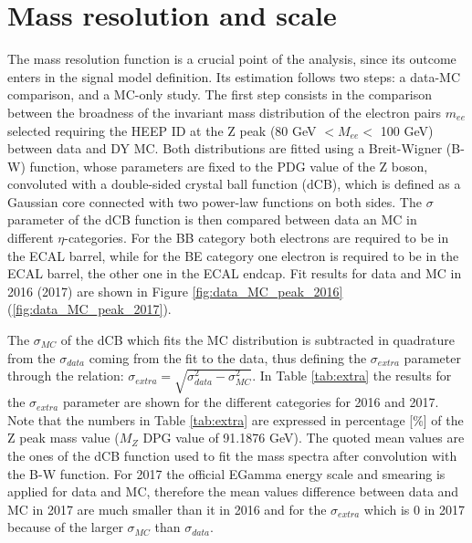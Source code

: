 \section{Mass resolution and scale}
\label{sec:mass_res}

The mass resolution function is a crucial point of the analysis, since its outcome enters in the signal model definition. Its estimation follows two steps: a data-MC comparison, and a MC-only study.
The first step consists in the comparison between the broadness of the invariant mass distribution of the electron pairs $m_{ee}$ selected requiring the HEEP ID at the Z peak (80 GeV $<M_{ee}<$ 100 GeV) between data and DY MC.
Both distributions are fitted using a Breit-Wigner (B-W) function, whose parameters are fixed to the PDG value of the Z boson, convoluted with a double-sided crystal ball function (dCB), which is defined as a Gaussian core connected with two power-law functions on both sides.
The $\sigma$ parameter of the dCB function is then compared between data an MC in different $\eta$-categories. For the BB category both electrons are required to be in the ECAL barrel, while for the BE category one electron is required to be in the ECAL barrel, the other one in the ECAL endcap.
Fit results for data and MC in 2016 (2017) are shown in Figure \ref{fig:data_MC_peak_2016} (\ref{fig:data_MC_peak_2017}).

The $\sigma_{MC}$ of the dCB which fits the MC distribution is subtracted in quadrature from the $\sigma_{data}$ coming from the fit to the data, thus defining the $\sigma_{extra}$ parameter through the relation: $\sigma_{extra}=\sqrt{\sigma_{data}^{2} - \sigma_{MC}^{2}}$.
In Table \ref{tab:extra} the results for the $\sigma_{extra}$ parameter are shown for the different categories for 2016 and 2017.
Note that the numbers in Table \ref{tab:extra} are expressed in percentage [\%] of the Z peak mass value ($M_{Z}$ DPG value of 91.1876 GeV). The quoted mean values are the ones of the dCB function used to fit the mass spectra after convolution with the B-W function. For 2017 the official EGamma energy scale and smearing is applied for data and MC, therefore the mean values difference between data and MC in 2017 are much smaller than it in 2016 and for the $\sigma_{extra}$ which is 0 in 2017 because of the larger $\sigma_{MC}$ than $\sigma_{data}$.

